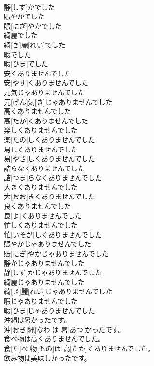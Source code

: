 \documentclass[8pt]{extreport}
\begin{document}
\begin{CJK}{UTF8}{min}
\\	静[しず]かでした
\\	賑やかでした	
\\	賑[にぎ]やかでした
\\	綺麗でした	
\\	綺[き]麗[れい]でした
\\	暇でした	
\\	暇[ひま]でした
\\	安くありませんでした	
\\	安[やす]くありませんでした
\\	元気じゃありませんでした	
\\	元[げん]気[き]じゃありませんでした
\\	高くありませんでした	
\\	高[たか]くありませんでした
\\	楽しくありませんでした	
\\	楽[たの]しくありませんでした
\\	易しくありませんでした	
\\	易[やさ]しくありませんでした
\\	詰らなくありませんでした	
\\	詰[つま]らなくありませんでした
\\	大きくありませんでした	
\\	大[おお]きくありませんでした
\\	良くありませんでした	
\\	良[よ]くありませんでした
\\	忙しくありませんでした	
\\	忙[いそが]しくありませんでした
\\	賑やかじゃありませんでした	
\\	賑[にぎ]やかじゃありませんでした
\\	静かじゃありませんでした	
\\	静[しず]かじゃありませんでした
\\	綺麗じゃありませんでした	
\\	綺[き]麗[れい]じゃありませんでした
\\	暇じゃありませんでした	
\\	暇[ひま]じゃありませんでした
\\	沖縄は暑かったです。	
\\	沖[おき]縄[なわ]は 暑[あつ]かったです。
\\	食べ物は高くありませんでした。	
\\	食[た]べ 物[もの]は 高[たか]くありませんでした。
\\	飲み物は美味しかったです。	

\end{CJK}
\end{document}
